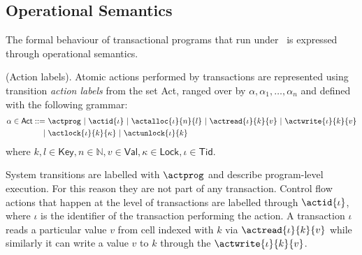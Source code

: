 \subsection{Operational Semantics}

The formal behaviour of transactional programs that run under \tpl\ is expressed through operational semantics.

\begin{defn}
	(Action labels).
	Atomic actions performed by transactions are represented using transition \emph{action labels} from the set \textsf{Act}, ranged over by $\alpha, \alpha_1, \ldots, \alpha_n$ and defined with the following grammar:
	\begin{align*}
		\alpha \in \mathsf{Act} ::=
		\ &\actprog\
		|\ \actid{\iota}\
		|\ \actalloc{\iota}{n}{l}\
		|\ \actread{\iota}{k}{v}\
		|\ \actwrite{\iota}{k}{v}\\
		|\ &\actlock{\iota}{k}{\kappa}\
		|\ \actunlock{\iota}{k}
	\end{align*}
	where $k, l \in \mathsf{Key}, n \in \mathds{N}, v \in \mathsf{Val}, \kappa \in \mathsf{Lock}, \iota \in \mathsf{Tid}$.
\end{defn}

System transitions are labelled with $\actprog$ and describe program-level execution. For this reason they are not part of any transaction. Control flow actions that happen at the level of transactions are labelled through $\actid{\iota}$, where $\iota$ is the identifier of the transaction performing the action. A transaction $\iota$ reads a particular value $v$ from cell indexed with $k$ via $\actread{\iota}{k}{v}$ while similarly it can write a value $v$ to $k$ through the $\actwrite{\iota}{k}{v}$.